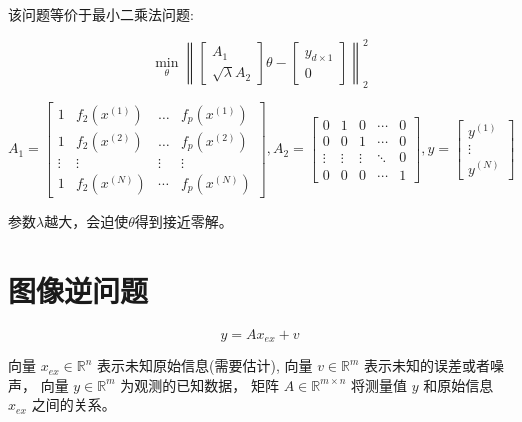 该问题等价于最小二乘法问题:

\begin{problem}
    \begin{equation}
\min _{\theta}\left\|\left[\begin{array}{r}
A_{1} \\
\sqrt{\lambda} A_{2}
\end{array}\right] \theta-\left[\begin{array}{l}
y_{d \times 1} \\
0
\end{array}\right]\right\|_{2}^{2}
\end{equation}

\begin{equation} A_{1}=\left[\begin{array}{cccc}1 & f_{2}\left(x^{(1)}\right) & \ldots & f_{p}\left(x^{(1)}\right) \\ 1 & f_{2}\left(x^{(2)}\right) & \ldots & f_{p}\left(x^{(2)}\right) \\ \vdots & \vdots & \vdots & \vdots \\ 1 & f_{2}\left(x^{(N)}\right) & \cdots & f_{p}\left(x^{(N)}\right)\end{array}\right],  A_{2}=\left[\begin{array}{ccccc}0 & 1 & 0 & \cdots & 0 \\ 0 & 0 & 1 & \cdots & 0 \\ \vdots & \vdots & \vdots & \ddots & 0 \\ 0 & 0 & 0 & \cdots & 1\end{array}\right], y=\left[\begin{array}{c}y^{(1)} \\ \vdots \\ y^{(N)}\end{array}\right] \end{equation}
\end{problem}

参数$\lambda$越大，会迫使$\theta$得到接近零解。

\section{图像逆问题}

\begin{problem}
    \begin{equation} y=A x_{e x}+v \end{equation}

向量 $ x_{e x} \in \mathbb{R}^{n} $ 表示未知原始信息(需要估计),
向量 $ v \in \mathbb{R}^{m} $ 表示未知的误差或者噪声，
向量 $ y \in \mathbb{R}^{m} $ 为观测的已知数据，
矩阵 $ A \in \mathbb{R}^{m \times n} $ 将测量值 $ y $ 和原始信息 $ x_{e x} $ 之间的关系。


\end{problem}

